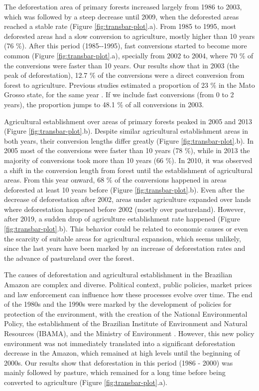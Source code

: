 \documentclass[essd, manuscript]{copernicus}
\begin{document}
The deforestation area of primary forests increased largely from 1986 to 2003, which was followed by a steep decrease until 2009, when the deforested areas reached a stable rate (Figure \ref{fig:transbar-plot}.a).
From 1985 to 1995, most deforested areas had a slow conversion to agriculture, mostly higher than 10 years (76 \%).
After this period (1985-\/-1995), fast conversions started to become more common (Figure \ref{fig:transbar-plot}.a), specially from 2002 to 2004, where 70 \% of the conversions were faster than 10 years.
Our results show that in 2003 (the peak of deforestation), 12.7 \% of the conversions were a direct conversion from forest to agriculture.
Previous studies estimated a proportion of 23 \% in the Mato Grosso state, for the same year \citep{Morton2006}.
If we include fast conversions (from 0 to 2 years), the proportion jumps to 48.1 \% of all conversions in 2003.

Agricultural establishment over areas of primary forests peaked in 2005 and 2013 (Figure \ref{fig:transbar-plot}.b).
Despite similar agricultural establishment areas in both years, their conversion lengths differ greatly (Figure \ref{fig:transbar-plot}.b).
In 2005 most of the conversions were faster than 10 years (78 \%), while in 2013 the majority of conversions took more than 10 years (66 \%).
In 2010, it was observed a shift in the conversion length from forest until the establishment of agricultural areas.
From this year onward, 68 \% of the conversions happened in areas deforested at least 10 years before (Figure \ref{fig:transbar-plot}.b).
Even after the decrease of deforestation after 2002, areas under agriculture expanded over lands where deforestation happened before 2002 (mostly over pastureland).
However, after 2019, a sudden drop of agriculture establishment rate happened (Figure \ref{fig:transbar-plot}.b).
This behavior could be related to economic causes \citep{Morton2006, Gusso2017, Hargrave2013} or even the scarcity of suitable areas for agricultural expansion, which seems unlikely, since the last years have been marked by an increase of deforestation rates and the advance of pastureland over the forest.

The causes of deforestation and agricultural establishment in the Brazilian Amazon are complex and diverse.
Political context, public policies, market prices and law enforcement can influence how these processes evolve over time.
The end of the 1980s and the 1990s were marked by the development of policies for protection of the environment, with the creation of the National Environmental Policy, the establishment of the Brazilian Institute of Environment and Natural Resources (IBAMA), and the Ministry of Environment \citep{Banerjee2009}.
However, this new policy environment was not immediately translated into a significant deforestation decrease in the Amazon, which remained at high levels until the beginning of 2000s.
Our results show that deforestation in this period (1986 - 2000) was mainly followed by pasture, which remained for a long time before being converted to agriculture (Figure \ref{fig:transbar-plot}.a).
\end{document}
